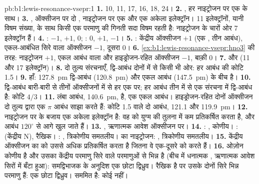 \begin{solution}{pb:b1:lewis-resonance-vsepr:1}
\textbf{1.}  10,  11,  17,  16,  18,
 24।
\textbf{2.} , हर नाइट्रोजन पर एक  के साथ।
\textbf{3.} , ऑक्सीजन पर दो , नाइट्रोजन पर एक  और एक
अकेला इलेक्ट्रॉन। 11 इलेक्ट्रॉनों, यानी विषम संख्या, के साथ किसी एक परमाणु की
गिनती सदा विषम रहती है: नाइट्रोजन के चारों ओर 7 इलेक्ट्रॉन हैं।
\textbf{4.} : $-1$, $+1$, $0$; : $0$, $+1$, $-1$।
\textbf{5.} : केंद्रीय ऑक्सीजन $+1$ (एक , तीन आबंध),
एकल-आबंधित सिरे वाला ऑक्सीजन $-1$, दूसरा 0।
\textbf{6.} \cref{ex:b1:lewis-resonance-vsepr:hno3} की तरह: नाइट्रोजन $+1$,
एकल आबंध वाला और हाइड्रोजन-रहित ऑक्सीजन $-1$, बाक़ी 0।
\textbf{7.}  और  (11 और 17 इलेक्ट्रॉन)।
\textbf{8.} दो तुल्य संरचनाएँ, द्वि-आबंध दोनों में से किसी भी ओर:
हर आबंध की कोटि 1.5।
\textbf{9.} हाँ: \qty{127.8}{pm} द्वि-आबंध
(\qty{120.8}{pm}) और एकल आबंध (\qty{147.5}{pm}) के बीच है।
\textbf{10.} द्वि-आबंध बारी-बारी से तीनों ऑक्सीजनों में से हर एक पर; हर
 आबंध तीन में से एक संरचना में द्वि-आबंध है: कोटि $4/3$।
\textbf{11.} लंबा आबंध, \qty{140.6}{pm},  है, एक एकल आबंध।
हाइड्रोजन-रहित दोनों ऑक्सीजन दो तुल्य  द्वारा एक $\pi$ आबंध
साझा करते हैं: कोटि 1.5 वाले दो आबंध, 121.1 और
\qty{119.9}{pm}।
\textbf{12.} नाइट्रोजन पर  के बजाय एक अकेला इलेक्ट्रॉन है:
वह  को युग्म की तुलना में कम प्रतिकर्षित करता है, और आबंध
$120^\circ$ से आगे खुल जाते हैं।
\textbf{13.} , ऋणात्मक आवेश ऑक्सीजन पर।
\textbf{14.} : , कोणीय। :  (केंद्रीय N),
रैखिक। : , त्रिकोणीय समतलीय।  का नाइट्रोजन:
, त्रिकोणीय समतलीय।
\textbf{15.} केंद्रीय ऑक्सीजन का   को उससे अधिक
प्रतिकर्षित करता है जितना वे एक-दूसरे को करते हैं।
\textbf{16.} ओज़ोन कोणीय है और उसका केंद्रीय परमाणु सिरे वाले परमाणुओं से भिन्न है
(बीच में धनात्मक , ऋणात्मक आवेश सिरों में बँटा हुआ):
समद्विभाजक के अनुदिश एक छोटा द्विध्रुव।  रैखिक है पर उसके
दोनों सिरे भिन्न परमाणु हैं: एक छोटा द्विध्रुव।  सममित है: कोई नहीं।

\end{solution}
